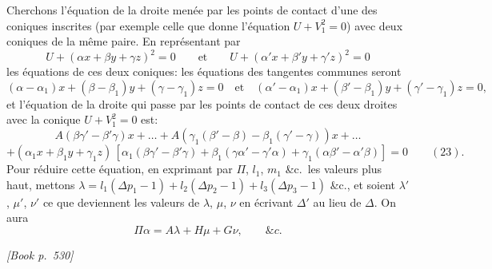\documentclass[11pt]{article}
\begin{document}
Cherchons l'\'equation de la droite men\'ee par les points de contact d'une des coniques inscrites (par exemple celle que donne l'\'equation $U + V_{1}^{2} = 0$) avec deux coniques de la m\^eme paire. En repr\'esentant par
\[
U + (\alpha x + \beta y + \gamma z)^{2} = 0\qquad \text{et}\qquad U + (\alpha' x + \beta' y + \gamma' z)^{2} = 0
\]
les \'equations de ces deux coniques: les \'equations des tangentes communes seront
\[
(\alpha - \alpha_{1}) x + (\beta - \beta_{1}) y + (\gamma - \gamma_{1}) z = 0\quad\text{et}\quad (\alpha' - \alpha_{1}) x + (\beta' - \beta_{1}) y + (\gamma' - \gamma_{1}) z = 0,
\]
et l'\'equation de la droite qui passe par les points de contact de ces deux droites avec la conique $U + V_{1}^{2} = 0$ est:
\[
A(\beta\gamma' - \beta'\gamma)x + \dots + A(\gamma_{1}(\beta' - \beta) - \beta_{1}(\gamma' - \gamma))x + \dots
\]
\[
+ (\alpha_{1}x + \beta_{1}y + \gamma_{1}z)\,[\alpha_{1}(\beta\gamma' - \beta'\gamma) + \beta_{1}(\gamma\alpha' - \gamma'\alpha) + \gamma_{1}(\alpha\beta' - \alpha'\beta)] = 0\qquad (23).
\]
Pour r\'eduire cette \'equation, en exprimant par $\Pi$, $l_{1}$, $m_{1}$ \&c.\ les valeurs plus haut, mettons $\lambda = l_{1}(\Delta p_{1} - 1) + l_{2}(\Delta p_{2} - 1) + l_{3}(\Delta p_{3} - 1)$ \&c., et soient $\lambda'$, $\mu'$, $\nu'$ ce que deviennent les valeurs de $\lambda$, $\mu$, $\nu$ en \'ecrivant $\Delta'$ au lieu de $\Delta$. On aura
\[
\Pi\alpha = A\lambda + H\mu + G\nu,\qquad \&c.
\]

\medskip
\noindent\textit{[Book p.~530]}\hfill

\smallskip
\end{document}
